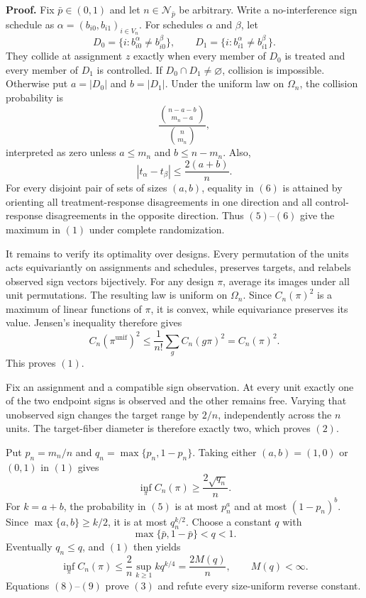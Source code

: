 \textbf{Proof.}
Fix \(\bar p\in(0,1)\) and let \(n\in\mathcal N_{\bar p}\) be arbitrary. Write a no-interference sign schedule as \(\alpha=(b_{i0},b_{i1})_{i\in V_n}\). For schedules \(\alpha\) and \(\beta\), let
\[
 D_0=\{i:b_{i0}^\alpha\ne b_{i0}^\beta\},
 \qquad
 D_1=\{i:b_{i1}^\alpha\ne b_{i1}^\beta\}. \tag{4}
\]
They collide at assignment \(z\) exactly when every member of \(D_0\) is treated and every member of \(D_1\) is controlled. If \(D_0\cap D_1\ne\varnothing\), collision is impossible. Otherwise put \(a=|D_0|\) and \(b=|D_1|\). Under the uniform law on \(\Omega_n\), the collision probability is
\[
 \frac{\binom{n-a-b}{m_n-a}}{\binom n{m_n}}, \tag{5}
\]
interpreted as zero unless \(a\le m_n\) and \(b\le n-m_n\). Also,
\[
 |t_\alpha-t_\beta|
 \le\frac{2(a+b)}n. \tag{6}
\]
For every disjoint pair of sets of sizes \((a,b)\), equality in \((6)\) is attained by orienting all treatment-response disagreements in one direction and all control-response disagreements in the opposite direction. Thus \((5)\)--\((6)\) give the maximum in \((1)\) under complete randomization.

It remains to verify its optimality over designs. Every permutation of the units acts equivariantly on assignments and schedules, preserves targets, and relabels observed sign vectors bijectively. For any design \(\pi\), average its images under all unit permutations. The resulting law is uniform on \(\Omega_n\). Since \(C_n(\pi)^2\) is a maximum of linear functions of \(\pi\), it is convex, while equivariance preserves its value. Jensen's inequality therefore gives
\[
 C_n(\pi^{\mathrm{unif}})^2
 \le \frac1{n!}\sum_g C_n(g\pi)^2
 =C_n(\pi)^2. \tag{7}
\]
This proves \((1)\).

Fix an assignment and a compatible sign observation. At every unit exactly one of the two endpoint signs is observed and the other remains free. Varying that unobserved sign changes the target range by \(2/n\), independently across the \(n\) units. The target-fiber diameter is therefore exactly two, which proves \((2)\).

Put \(p_n=m_n/n\) and \(q_n=\max\{p_n,1-p_n\}\). Taking either \((a,b)=(1,0)\) or \((0,1)\) in \((1)\) gives
\[
 \inf_\pi C_n(\pi)\ge\frac{2\sqrt{q_n}}n. \tag{8}
\]
For \(k=a+b\), the probability in \((5)\) is at most \(p_n^a\) and at most \((1-p_n)^b\). Since \(\max\{a,b\}\ge k/2\), it is at most \(q_n^{k/2}\). Choose a constant \(q\) with
\[
 \max\{\bar p,1-\bar p\}<q<1.
\]
Eventually \(q_n\le q\), and \((1)\) then yields
\[
 \inf_\pi C_n(\pi)
 \le\frac2n\sup_{k\ge1}kq^{k/4}
 =\frac{2M(q)}n,
 \qquad M(q)<\infty. \tag{9}
\]
Equations \((8)\)--\((9)\) prove \((3)\) and refute every size-uniform reverse constant.


